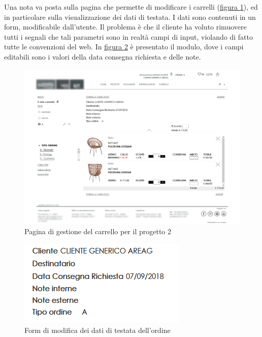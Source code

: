 Una nota va posta sulla pagina che permette di modificare i carrelli (\hyperref[fig:carrello-2]{figura \ref{fig:carrello-2}}), ed in particolare sulla visualizzazione dei dati di testata. I dati sono contenuti in un form, modificabile dall'utente. Il problema è che il cliente ha voluto rimuovere tutti i segnali che tali parametri sono in realtà campi di input, violando di fatto tutte le convenzioni del web. In \hyperref[fig:carrello-form]{figura \ref{fig:carrello-form}} è presentato il modulo, dove i campi editabili sono i valori della data consegna richiesta e delle note.
\begin{figure}[H]
	\centering
	\includegraphics[width=\linewidth]{Immagini/p2/carrello.png}
	\caption{Pagina di gestione del carrello per il progetto 2}
	\label{fig:carrello-2}
\end{figure}
\begin{figure}[H]
	\centering
	\includegraphics[width=0.5\linewidth]{Immagini/p2/carrello-form.png}
	\caption{Form di modifica dei dati di testata dell'ordine}
	\label{fig:carrello-form}
\end{figure}